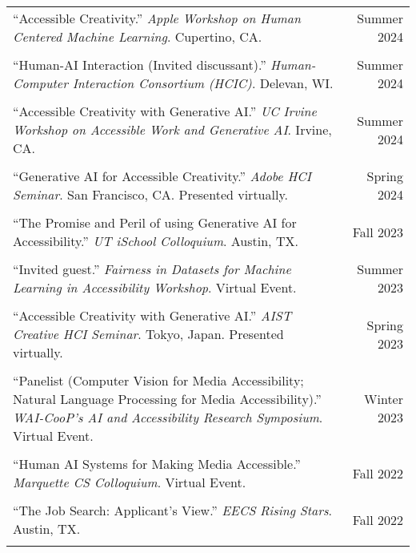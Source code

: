 \begin{longtable}{Xr}
	``Accessible Creativity.'' \textit{Apple Workshop on Human Centered Machine Learning}. Cupertino, CA. & Summer 2024 \\
	\\

	``Human-AI Interaction (Invited discussant).'' \textit{Human-Computer Interaction Consortium (HCIC)}. Delevan, WI. & Summer 2024 \\
	\\

	``Accessible Creativity with Generative AI.'' \textit{UC Irvine Workshop on Accessible Work and Generative AI}. Irvine, CA. & Summer 2024 \\
	\\

	``Generative AI for Accessible Creativity.'' \textit{Adobe HCI Seminar}. San Francisco, CA. Presented virtually. & Spring 2024 \\
	\\

	``The Promise and Peril of using Generative AI for Accessibility.'' \textit{UT iSchool Colloquium}. Austin, TX. & Fall 2023 \\
	\\

	``Invited guest.'' \textit{Fairness in Datasets for Machine Learning in Accessibility Workshop}. Virtual Event. & Summer 2023 \\
	\\

	``Accessible Creativity with Generative AI.'' \textit{AIST Creative HCI Seminar}. Tokyo, Japan. Presented virtually. & Spring 2023 \\
	\\

	``Panelist (Computer Vision for Media Accessibility; Natural Language Processing for Media Accessibility).'' \textit{WAI-CooP’s AI and Accessibility Research Symposium}. Virtual Event. & Winter 2023 \\
	\\

	``Human AI Systems for Making Media Accessible.'' \textit{Marquette CS Colloquium}. Virtual Event. & Fall 2022 \\
	\\

	``The Job Search: Applicant's View.'' \textit{EECS Rising Stars}. Austin, TX. & Fall 2022 \\
	\\


\end{longtable}
